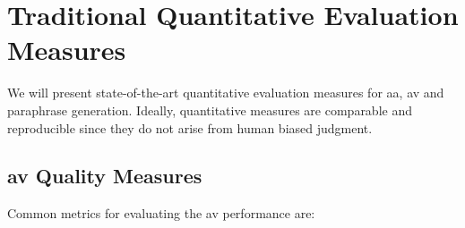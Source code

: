 \section{Traditional Quantitative Evaluation Measures}
\label{sec:traditional_quantitative_evaluation_measures}

We will present state-of-the-art quantitative evaluation measures for \ac{aa}, \ac{av} and paraphrase generation.
Ideally, quantitative measures are comparable and reproducible since they do not arise from human biased judgment.

\subsection{\ac{av} Quality Measures}
\label{subsec:av_quality_measures}

Common metrics for evaluating the \ac{av} performance are:
